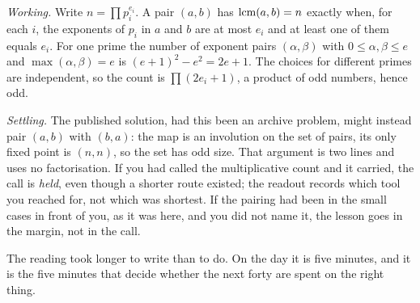 \emph{Working.} Write $n = \prod p_i^{e_i}$. A pair $(a, b)$ has $\operatorname{lcm}(a, b) = n$ exactly when, for each $i$, the exponents of $p_i$ in $a$ and $b$ are at most $e_i$ and at least one of them equals $e_i$. For one prime the number of exponent pairs $(\alpha, \beta)$ with $0 \le \alpha, \beta \le e$ and $\max(\alpha, \beta) = e$ is $(e+1)^2 - e^2 = 2e + 1$. The choices for different primes are independent, so the count is $\prod (2 e_i + 1)$, a product of odd numbers, hence odd.

\emph{Settling.} The published solution, had this been an archive problem, might instead pair $(a, b)$ with $(b, a)$: the map is an involution on the set of pairs, its only fixed point is $(n, n)$, so the set has odd size. That argument is two lines and uses no factorisation. If you had called the multiplicative count and it carried, the call is \emph{held}, even though a shorter route existed; the readout records which tool you reached for, not which was shortest. If the pairing had been in the small cases in front of you, as it was here, and you did not name it, the lesson goes in the margin, not in the call.

The reading took longer to write than to do. On the day it is five minutes, and it is the five minutes that decide whether the next forty are spent on the right thing.

